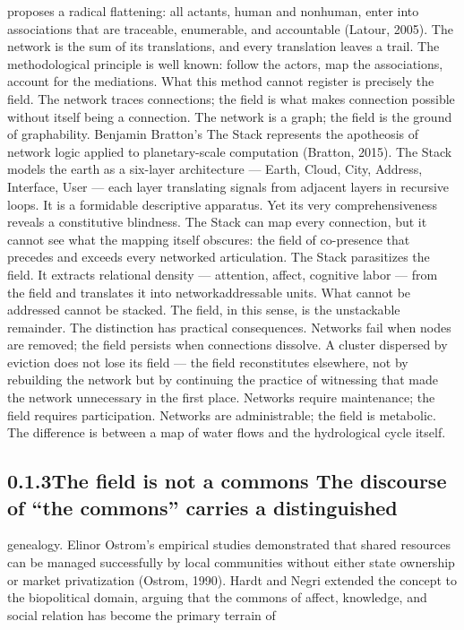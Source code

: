 proposes a radical flattening: all actants, human and nonhuman, enter into associations that are traceable, enumerable, and accountable (Latour, 2005). The network is the sum of its translations, and every translation leaves a trail. The methodological principle is well known: follow the actors, map the associations, account for the mediations. What this method cannot register is precisely the field. The network traces connections; the field is what makes connection possible without itself being a connection. The network is a graph; the field is the ground of graphability. Benjamin Bratton’s The Stack represents the apotheosis of network logic applied to planetary-scale computation (Bratton, 2015). The Stack models the earth as a six-layer architecture — Earth, Cloud, City, Address, Interface, User — each layer translating signals from adjacent layers in recursive loops. It is a formidable descriptive apparatus. Yet its very comprehensiveness reveals a constitutive blindness. The Stack can map every connection, but it cannot see what the mapping itself obscures: the field of co-presence that precedes and exceeds every networked articulation. The Stack parasitizes the field. It extracts relational density — attention, affect, cognitive labor — from the field and translates it into networkaddressable units. What cannot be addressed cannot be stacked. The field, in this sense, is the unstackable remainder. The distinction has practical consequences. Networks fail when nodes are removed; the field persists when connections dissolve. A cluster dispersed by eviction does not lose its field — the field reconstitutes elsewhere, not by rebuilding the network but by continuing the practice of witnessing that made the network unnecessary in the first place. Networks require maintenance; the field requires participation. Networks are administrable; the field is metabolic. The difference is between a map of water flows and the hydrological cycle itself.

\subsection{0.1.3\quad The field is not a commons The discourse of “the commons” carries a distinguished}

genealogy. Elinor Ostrom’s empirical studies demonstrated that shared resources can be managed successfully by local communities without either state ownership or market privatization (Ostrom, 1990). Hardt and Negri extended the concept to the biopolitical domain, arguing that the commons of affect, knowledge, and social relation has become the primary terrain of

